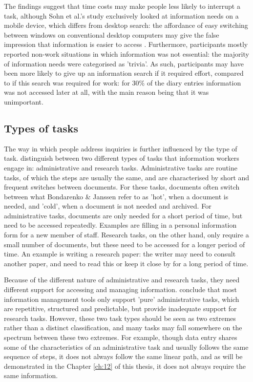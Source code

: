 The findings suggest that time costs may make people less likely to interrupt a task, although Sohn et al.’s study exclusively looked at information needs on a mobile device, which differs from desktop search: the affordance of easy switching between windows on conventional desktop computers may give the false impression that information is easier to access \citep{Sellen2003}. Furthermore, participants mostly reported non-work situations in which information was not essential: the majority of information needs were categorised as 'trivia'. As such, participants may have been more likely to give up an information search if it required effort, compared to if this search was required for work: for 30\% of the diary entries information was not accessed later at all, with the main reason being that it was unimportant. 

\subsection{Types of tasks}
The way in which people address inquiries is further influenced by the type of task. \citet{Bondarenko2005} distinguish between two different types of tasks that information workers engage in: administrative and research tasks. Administrative tasks are routine tasks, of which the steps are usually the same, and are characterised by short and frequent switches between documents. For these tasks, documents often switch between what Bondarenko \& Janssen refer to as 'hot', when a document is needed, and 'cold', when a document is not needed and archived. For administrative tasks, documents are only needed for a short period of time, but need to be accessed repeatedly. Examples are filling in a personal information form for a new member of staff. Research tasks, on the other hand, only require a small number of documents, but these need to be accessed for a longer period of time. An example is writing a research paper: the writer may need to consult another paper, and need to read this or keep it close by for a long period of time.

Because of the different nature of administrative and research tasks, they need different support for accessing and managing information. \citet{Bondarenko2005} conclude that most information management tools only support 'pure' administrative tasks, which are repetitive, structured and predictable, but provide inadequate support for research tasks. However, these two task types should be seen as two extremes rather than a distinct classification, and many tasks may fall somewhere on the spectrum between these two extremes. For example, though data entry shares some of the characteristics of an administrative task and usually follows the same sequence of steps, it does not always follow the same linear path, and as will be demonstrated in the Chapter \ref{ch:12} of this thesis, it does not always require the same information. 

